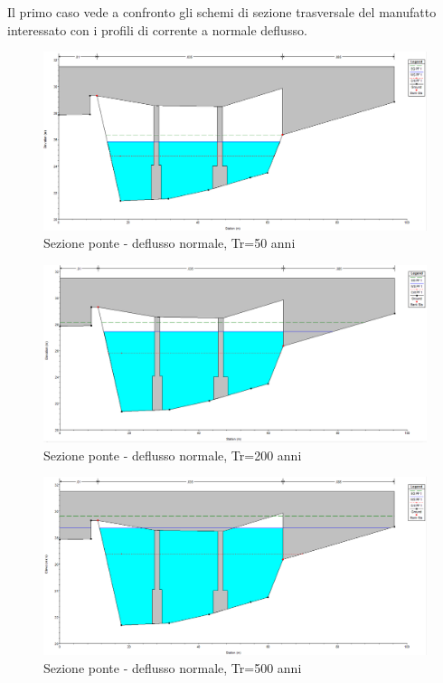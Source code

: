 \documentclass[12pt]{article} %
\begin{document}
\noindent Il primo caso vede a confronto gli schemi di sezione trasversale del manufatto interessato con i profili di corrente a normale deflusso.

\begin{figure}[H]
    \centering
    \includegraphics[scale=0.5]{Bridge474.PNG}
    \caption{Sezione ponte - deflusso normale, Tr=50 anni}
\end{figure}

\begin{figure}[H]
    \centering
    \includegraphics[scale=0.5]{Bridge839.PNG}
    \caption{Sezione ponte - deflusso normale, Tr=200 anni}
\end{figure}

\begin{figure}[H]
    \centering
    \includegraphics[scale=0.5]{Bridge1223.PNG}
    \caption{Sezione ponte - deflusso normale, Tr=500 anni}
\end{figure}
\end{document}
